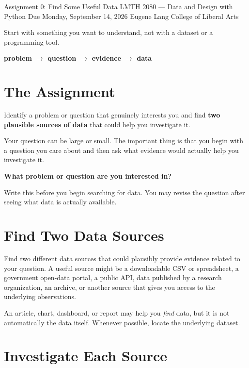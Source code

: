 \documentclass[11pt]{article}
\begin{document}
\courseheader
  {Assignment 0: Find Some Useful Data}
  {LMTH 2080 --- Data and Design with Python}
  {Due Monday, September 14, 2026}
  {Eugene Lang College of Liberal Arts}

\begin{keyidea}
Start with something you want to understand, not with a dataset or a
programming tool.

\begin{center}
\large\bfseries
problem $\longrightarrow$ question $\longrightarrow$ evidence
$\longrightarrow$ data
\end{center}
\end{keyidea}

\section{The Assignment}

Identify a problem or question that genuinely interests you and find
\textbf{two plausible sources of data} that could help you investigate it.

Your question can be large or small. The important thing is that you begin
with a question you care about and then ask what evidence would actually help
you investigate it.

\begin{dataprompt}
\textbf{What problem or question are you interested in?}

Write this before you begin searching for data. You may revise the question
after seeing what data is actually available.
\end{dataprompt}

\section{Find Two Data Sources}

Find two different data sources that could plausibly provide evidence related
to your question. A useful source might be a downloadable CSV or spreadsheet,
a government open-data portal, a public API, data published by a research
organization, an archive, or another source that gives you access to the
underlying observations.

An article, chart, dashboard, or report may help you \emph{find} data, but it
is not automatically the data itself. Whenever possible, locate the
underlying dataset.

\section{Investigate Each Source}
\end{document}
